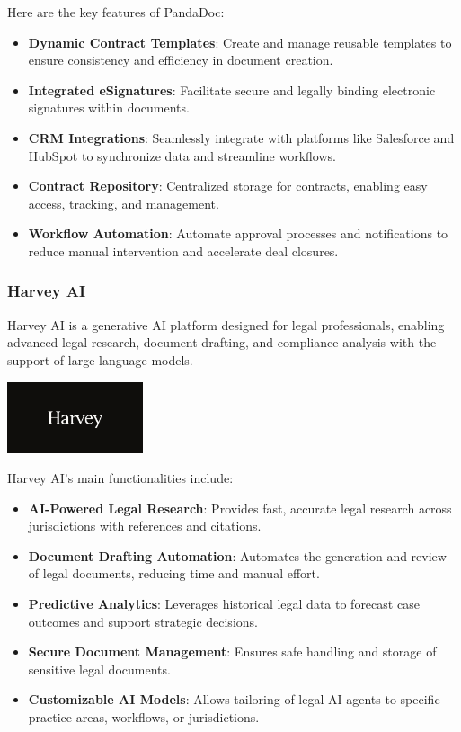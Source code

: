 Here are the key features of PandaDoc:
\begin{itemize}
    \item \textbf{Dynamic Contract Templates}: Create and manage reusable templates to ensure consistency and efficiency in document creation.
    \item \textbf{Integrated eSignatures}: Facilitate secure and legally binding electronic signatures within documents. 
    \item \textbf{CRM Integrations}: Seamlessly integrate with platforms like Salesforce and HubSpot to synchronize data and streamline workflows. 
    \item \textbf{Contract Repository}: Centralized storage for contracts, enabling easy access, tracking, and management. 
    \item \textbf{Workflow Automation}: Automate approval processes and notifications to reduce manual intervention and accelerate deal closures. 
\end{itemize}

\subsubsection{Harvey AI}
Harvey AI is a generative AI platform designed for legal professionals, enabling advanced legal research, document drafting, and compliance analysis with the support of large language models.\mynewline

\begin{center}
    \centering
    \includegraphics[width=0.3\textwidth]{Images/harveyai_logo.png}
     \cite{harveyai_logo}
    \label{fig:harveyai_logo}
\end{center}

Harvey AI’s main functionalities include:
\begin{itemize}
    \item \textbf{AI-Powered Legal Research}: Provides fast, accurate legal research across jurisdictions with references and citations.
    \item \textbf{Document Drafting Automation}: Automates the generation and review of legal documents, reducing time and manual effort.
    \item \textbf{Predictive Analytics}: Leverages historical legal data to forecast case outcomes and support strategic decisions.
    \item \textbf{Secure Document Management}: Ensures safe handling and storage of sensitive legal documents.
    \item \textbf{Customizable AI Models}: Allows tailoring of legal AI agents to specific practice areas, workflows, or jurisdictions.
\end{itemize}

